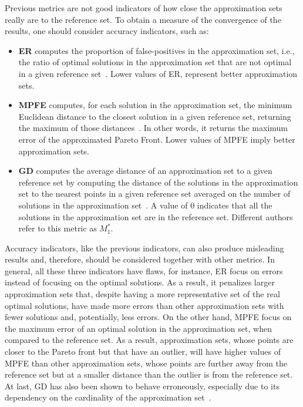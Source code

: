 	Previous metrics are not good indicators of how close the approximation sets really are to the reference set. To obtain a measure of the convergence of the results, one should consider accuracy indicators, such as:
	\begin{itemize}
		\item \textbf{\ac{ER}} computes the proportion of false-positives in the approximation set, i.e., the ratio of optimal solutions in the approximation set that are not optimal in a given reference set~\cite{Veldhuizen1999GD}. Lower values of \ac{ER}, represent better approximation sets. 
		\item \textbf{\ac{MPFE}} computes, for each solution in the approximation set, the minimum Euclidean distance to the closest solution in a given reference set, returning the maximum of those distances~\cite{Veldhuizen1999GD}. In other words, it returns the maximum error of the approximated Pareto Front. Lower values of \ac{MPFE} imply better approximation sets. 
		\item \textbf{\ac{GD}} computes the average distance of an approximation set to a given reference set by computing the distance of the solutions in the approximation set to the nearest points in a given reference set averaged on the number of solutions in the approximation set~\cite{Veldhuizen1999GD}. A value of $0$ indicates that all the solutions in the approximation set are in the reference set. Different authors\cite{Zitzler2000m1m3} refer to this metric as \textbf{$M_1^\ast$}.
	\end{itemize}
	
	Accuracy indicators, like the previous indicators, can also produce misleading results and, therefore, should be considered together with other metrics. In general, all these three indicators have flaws, for instance, \ac{ER} focus on errors instead of focusing on the optimal solutions. As a result, it penalizes larger approximation sets that, despite having a more representative set of the real optimal solutions, have made more errors than other approximation sets with fewer solutions and, potentially, less errors. On the other hand, \ac{MPFE} focus on the maximum error of an optimal solution in the approximation set, when compared to the reference set. As a result, approximation sets, whose points are closer to the Pareto front but that have an outlier, will have higher values of \ac{MPFE} than other approximation sets, whose points are further away from the reference set but at a smaller distance than the outlier is from the reference set. At last, \ac{GD} has also been shown to behave erroneously, especially due to its dependency on the cardinality of the approximation set~\cite{Ishibuchi2005GDIGD}.
	
